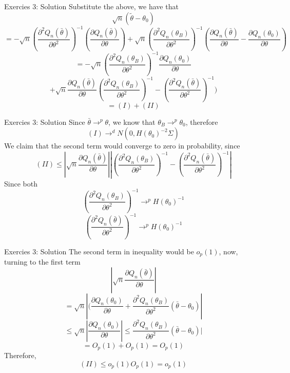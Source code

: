 \documentclass{beamer}
\begin{document}
\begin{frame}{Exercies 3: Solution}
	Substitute the above, we have that 
	\[\sqrt{n}(\tilde{\theta} - \theta_0)\]
	\[=-\sqrt{n}(\frac{\partial^2 Q_n(\bar{\theta})}{\partial \theta^2})^{-1} (\frac{\partial Q_n(\bar{\theta})}{\partial \theta})+ \sqrt{n} (\frac{\partial^2 Q_n(\theta_B)}{\partial \theta^2})^{-1} (\frac{\partial Q_n(\bar{\theta})}{\partial \theta}  -  \frac{\partial Q_n(\theta_0)}{\partial \theta})\]
\[= -\sqrt{n} (\frac{\partial^2 Q_n(\theta_B)}{\partial \theta^2})^{-1}\frac{\partial Q_n(\theta_0)}{\partial \theta} \]
\[+\sqrt{n}\frac{\partial Q_n(\bar{\theta})}{\partial \theta} (\frac{\partial^2 Q_n(\theta_B)}{\partial \theta^2})^{-1} - (\frac{\partial^2 Q_n(\bar{\theta})}{\partial \theta^2})^{-1}) \]
\[ = (I) + (II)\]
\end{frame}
\begin{frame}{Exercies 3: Solution}
	Since $\bar{\theta} \rightarrow^p \theta$, we know that $\theta_B \rightarrow^p \theta_0$, therefore
	\[(I) \rightarrow^d N(0,H(\theta_0)^{-2} \Sigma)\]
	We claim that the second term would converge to zero in probability, since
\[(II) \leq |\sqrt{n}\frac{\partial Q_n(\bar{\theta})}{\partial \theta}| |(\frac{\partial^2 Q_n(\theta_B)}{\partial \theta^2})^{-1} - (\frac{\partial^2 Q_n(\bar{\theta})}{\partial \theta^2})^{-1}|\]
Since both 
\[(\frac{\partial^2 Q_n(\theta_B)}{\partial \theta^2})^{-1} \rightarrow^p H(\theta_0)^{-1}\]
\[(\frac{\partial^2 Q_n(\bar{\theta})}{\partial \theta^2})^{-1} \rightarrow^p H(\theta_0)^{-1}\]
\end{frame}
\begin{frame}{Exercies 3: Solution}
	The second term in inequality would be $o_p(1)$, now, turning to the first term
	\[|\sqrt{n}\frac{\partial Q_n(\bar{\theta})}{\partial \theta}|\]
\[ = \sqrt{n} |(\frac{\partial Q_n(\theta_0)}{\partial \theta} + \frac{\partial^2 Q_n(\theta_B)}{\partial \theta^2} (\bar{\theta} - \theta_0)|\]
\[\leq \sqrt{n} |\frac{\partial Q_n(\theta_0)}{\partial \theta}| \leq \frac{\partial^2 Q_n(\theta_B)}{\partial\theta^2} (\bar{\theta} - \theta_0)|\]
\[ = O_p(1) + O_p(1) = O_p(1)\]
Therefore,
\[(II) \leq o_p(1) O_p(1) = o_p(1)\]
\end{frame}
\end{document}
